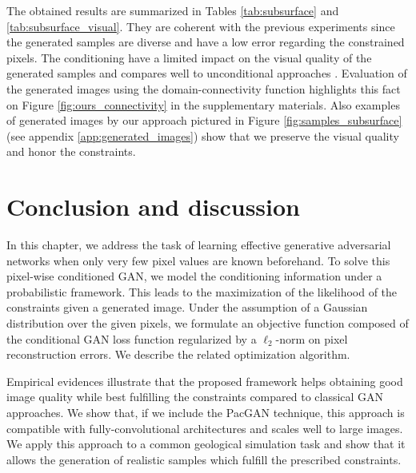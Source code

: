 
The obtained results are summarized in Tables \ref{tab:subsurface} and \ref{tab:subsurface_visual}. They are coherent with the previous experiments since the generated samples are diverse and have a low error regarding the constrained pixels. The conditioning have a limited impact on the visual quality of the generated samples and compares well to unconditional approaches \citep{Ruffino2017}. Evaluation of the generated images using the domain-connectivity function highlights this fact on Figure \ref{fig:ours_connectivity} in the supplementary materials. Also examples of generated images by our approach  pictured in Figure \ref{fig:samples_subsurface} (see appendix \ref{app:generated_images}) show that we preserve the visual quality and honor the constraints.


\section{Conclusion and discussion}

In this chapter, we address the task of learning effective generative adversarial networks when only very few pixel values are known beforehand. To solve this pixel-wise conditioned GAN, we model the conditioning information under a probabilistic framework. This leads to the maximization of the likelihood of the constraints given a
generated image. Under the assumption of a Gaussian distribution over the given pixels, we formulate an objective function composed of the conditional GAN loss function regularized by a $\ell_2$-norm on pixel reconstruction errors. We describe the related optimization algorithm.

Empirical evidences illustrate that the proposed framework helps obtaining good image quality while best fulfilling the constraints compared to classical GAN approaches. We show that, if we include the PacGAN technique,  this  approach  is  compatible  with  fully-convolutional  architectures  and scales well to large images. We apply this approach to a common geological simulation task and show that it allows the generation of realistic samples which fulfill the prescribed constraints.

